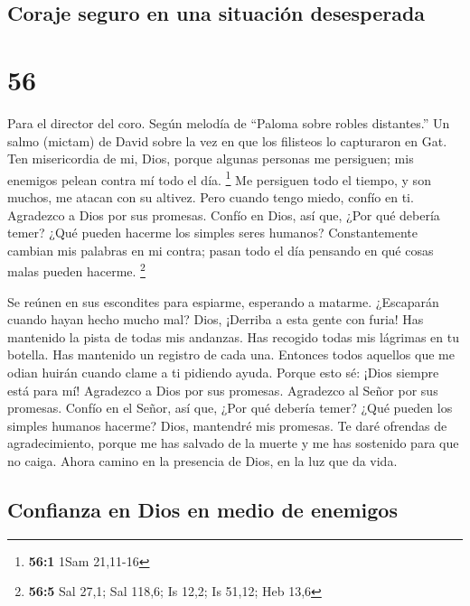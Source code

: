 \hypertarget{coraje-seguro-en-una-situaciuxf3n-desesperada}{%
\subsection{Coraje seguro en una situación
desesperada}\label{coraje-seguro-en-una-situaciuxf3n-desesperada}}

\hypertarget{section-55}{%
\section{56}\label{section-55}}

Para el director del coro. Según melodía de ``Paloma sobre robles
distantes.'' Un salmo (mictam) de David sobre la vez en que los
filisteos lo capturaron en Gat.  Ten misericordia de mi,
Dios, porque algunas personas me persiguen; mis enemigos pelean contra
mí todo el día. \footnote{\textbf{56:1} 1Sam 21,11-16}  Me
persiguen todo el tiempo, y son muchos, me atacan con su altivez.
 Pero cuando tengo miedo, confío en ti. 
Agradezco a Dios por sus promesas. Confío en Dios, así que, ¿Por qué
debería temer? ¿Qué pueden hacerme los simples seres humanos?
 Constantemente cambian mis palabras en mi contra; pasan
todo el día pensando en qué cosas malas pueden hacerme. \footnote{\textbf{56:5}
  Sal 27,1; Sal 118,6; Is 12,2; Is 51,12; Heb 13,6}

 Se reúnen en sus escondites para espiarme, esperando a
matarme.  ¿Escaparán cuando hayan hecho mucho mal? Dios,
¡Derriba a esta gente con furia!  Has mantenido la pista de
todas mis andanzas. Has recogido todas mis lágrimas en tu botella. Has
mantenido un registro de cada una.  Entonces todos aquellos
que me odian huirán cuando clame a ti pidiendo ayuda. Porque esto sé:
¡Dios siempre está para mí!  Agradezco a Dios por sus
promesas. Agradezco al Señor por sus promesas.  Confío en
el Señor, así que, ¿Por qué debería temer? ¿Qué pueden los simples
humanos hacerme?  Dios, mantendré mis promesas. Te daré
ofrendas de agradecimiento,  porque me has salvado de la
muerte y me has sostenido para que no caiga. Ahora camino en la
presencia de Dios, en la luz que da vida.

\hypertarget{confianza-en-dios-en-medio-de-enemigos}{%
\subsection{Confianza en Dios en medio de
enemigos}\label{confianza-en-dios-en-medio-de-enemigos}}

